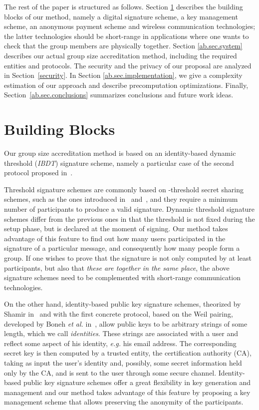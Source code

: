 \documentclass[11pt]{llncs}
\begin{document}
The rest of the paper is structured as follows.
Section \ref{ab.sec.buildingblocks} describes the building
blocks of our method, namely a digital
signature scheme, a key management scheme, an anonymous
payment scheme and wireless communication technologies;
the latter technologies should be short-range in applications
where one wants to check that the group members
are physically together.
Section \ref{ab.sec.system} describes our actual
group size accreditation method, including the required entities and protocols.
The security and the privacy
of our proposal are analyzed in Section~\ref{security}.
In Section \ref{ab.sec.implementation}, we give
a complexity estimation of our approach and describe
precomputation optimizations.
Finally, Section~\ref{ab.sec.conclusions} summarizes conclusions
and future work ideas.




\section{Building Blocks}\label{ab.sec.buildingblocks}

Our group size accreditation method is based on an identity-based
dynamic threshold (\emph{IBDT}) signature scheme, namely a
particular case of the second protocol proposed in~\cite{ab.Herranz2012}.

Threshold signature schemes are commonly based on
-threshold secret sharing schemes, such as
the ones introduced in~\cite{ab.Blakley1979} and~\cite{ab.Shamir1979},
and they require a minimum number  of participants
to produce a valid signature.
Dynamic threshold signature schemes differ from
the previous ones in that the threshold  is not fixed during
the setup phase, but is declared at the moment of signing.
Our method takes advantage of this feature to find out
how many users participated in the signature of
a particular message, and consequently how many
people form a group.
If one wishes to prove that the signature is not only computed
by at least  participants, but also that {\em these are
together in the same place}, the above signature schemes
need to be complemented
with short-range communication technologies.

On the other hand, identity-based public key signature schemes,
theorized by Shamir in~\cite{ab.Shamir1985} and with the
first concrete protocol, based on the Weil pairing,
developed by Boneh \emph{et al.} in~\cite{ab.Boneh2001},
allow public keys 
to be arbitrary strings of some length, which we call \emph{identities}.
These strings are associated with a user  and reflect some
aspect of his identity, \emph{e.g.} his email address.
The corresponding secret key  is then computed by a trusted entity,
the certification authority (CA), taking as input the user's identity and,
possibly, some secret information held only by the CA, and is
sent to the user  through some secure channel.
Identity-based public key signature schemes offer a great flexibility
in key generation and management and our method takes advantage
of this feature by proposing a key management scheme that allows
preserving the anonymity of the participants.
\end{document}
